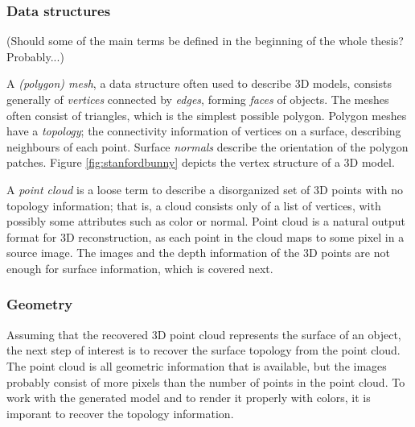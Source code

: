 
\subsubsection{Data structures} %



(Should some of the main terms be defined in the beginning of the whole thesis? Probably...)

A \emph{(polygon) mesh}, a data structure often used to describe 3D models, consists generally of \emph{vertices} connected by \emph{edges}, forming \emph{faces} of objects.
The meshes often consist of triangles, which is the simplest possible polygon.
Polygon meshes have a \emph{topology}; the connectivity information of vertices on a surface, describing neighbours of each point.
Surface \emph{normals} describe the orientation of the polygon patches.
Figure \ref{fig:stanfordbunny} depicts the vertex structure of a 3D model.

A \emph{point cloud} is a loose term to describe a disorganized set of 3D points with no topology information; that is, a cloud consists only of a list of vertices, with possibly some attributes such as color or normal.
Point cloud is a natural output format for 3D reconstruction, as each point in the cloud maps to some pixel in a source image.
The images and the depth information of the 3D points are not enough for surface information, which is covered next.


\subsubsection{Geometry} %

Assuming that the recovered 3D point cloud represents the surface of an object, the next step of interest is to recover the surface topology from the point cloud.
The point cloud is all geometric information that is available, but the images probably consist of more pixels than the number of points in the point cloud.
To work with the generated model and to render it properly with colors, it is imporant to recover the topology information.

